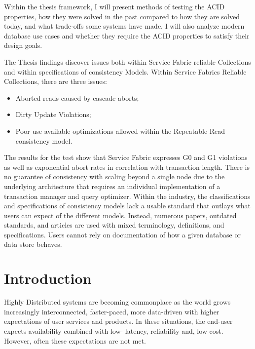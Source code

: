 \documentclass[a4paper,10pt,titlepage]{report}
\begin{document}
    Within the thesis framework, I will present methods of testing the ACID properties, how they were solved in the past compared to how they are solved today, and what trade-offs some systems have made. I will also analyze modern database use cases and whether they require the ACID properties to satisfy their design goals.\\
    \vspace{5mm}


    The Thesis findings discover issues both within Service Fabric reliable Collections and within specifications of consistency Models. 
    Within Service Fabrics Reliable Collections, there are three issues: 
    \begin{itemize}
    \item Aborted reads caused by cascade aborts;
    \item Dirty Update Violations;
    \item Poor use available optimizations allowed within the Repeatable Read consistency model. 
    \end{itemize}
    
    The results for the test show that Service Fabric expresses G0 and G1 violations as well as exponential abort rates in correlation with transaction length. There is no guarantee of consistency with scaling beyond a single node due to the underlying architecture that requires an individual implementation of a transaction manager and query optimizer.
    Within the industry, the classifications and specifications of consistency models lack a usable standard that outlays what users can expect of the different models.
    Instead, numerous papers, outdated standards, and articles are used with mixed terminology, definitions, and specifications. Users cannot rely on documentation of how a given database or data store behaves.



    \chapter{Introduction}
    Highly Distributed systems are becoming commonplace as the world grows increasingly interconnected, faster-paced, more data-driven with higher expectations of user services and products. In these situations, the end-user expects availability combined with low- latency, reliability and, low cost. However, often these expectations are not met.
\end{document}
